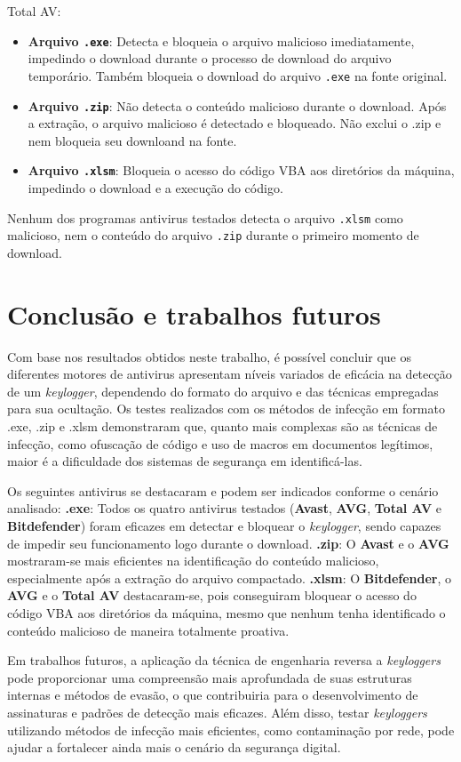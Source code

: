 \documentclass[12pt]{article}
\begin{document}
\noindent Total AV:
\begin{itemize}
    \item \textbf{Arquivo \texttt{.exe}}: Detecta e bloqueia o arquivo malicioso imediatamente, impedindo o download durante o processo de download do arquivo temporário. Também bloqueia o download do arquivo \texttt{.exe} na fonte original.
    \item \textbf{Arquivo \texttt{.zip}}: Não detecta o conteúdo malicioso durante o download. Após a extração, o arquivo malicioso é detectado e bloqueado. Não exclui o .zip e nem bloqueia seu downloand na fonte.
    \item \textbf{Arquivo \texttt{.xlsm}}: Bloqueia o acesso do código VBA aos diretórios da máquina, impedindo o download e a execução do código.
\end{itemize}

\noindent Nenhum dos programas antivirus testados detecta o arquivo \texttt{.xlsm} como malicioso, nem o conteúdo do arquivo \texttt{.zip} durante o primeiro momento de download.

\section{Conclusão e trabalhos futuros}
Com base nos resultados obtidos neste trabalho, 
é possível concluir que os diferentes motores de antivirus 
apresentam níveis variados de eficácia na detecção de um \textit{keylogger}, 
dependendo do formato do arquivo e das técnicas empregadas para sua ocultação. 
Os testes realizados com os métodos de infecção em formato .exe, .zip e .xlsm demonstraram que, 
quanto mais complexas são as técnicas de infecção, como ofuscação de código e uso de macros 
em documentos legítimos, maior é a dificuldade dos sistemas de segurança em identificá-las.

Os seguintes antivirus se destacaram e podem ser indicados conforme o cenário analisado:  
\textbf{.exe}: Todos os quatro antivirus testados (\textbf{Avast}, \textbf{AVG}, \textbf{Total AV} e \textbf{Bitdefender}) foram eficazes em detectar e bloquear o \textit{keylogger}, sendo capazes de impedir seu funcionamento logo durante o download.  
\textbf{.zip}: O \textbf{Avast} e o \textbf{AVG} mostraram-se mais eficientes na identificação do conteúdo malicioso, especialmente após a extração do arquivo compactado.  
\textbf{.xlsm}: O \textbf{Bitdefender}, o \textbf{AVG} e o \textbf{Total AV} destacaram-se, pois conseguiram bloquear o acesso do código VBA aos diretórios da máquina, mesmo que nenhum tenha identificado o conteúdo malicioso de maneira totalmente proativa.

Em trabalhos futuros, a aplicação da técnica de engenharia reversa a \textit{keyloggers} pode 
proporcionar uma compreensão mais aprofundada de suas estruturas internas e métodos de evasão, 
o que contribuiria para o desenvolvimento de assinaturas e padrões de detecção mais eficazes. Além disso, 
testar \textit{keyloggers} utilizando métodos de infecção mais eficientes, 
como contaminação por rede, pode ajudar a fortalecer ainda mais o cenário da segurança digital.




\end{document}
